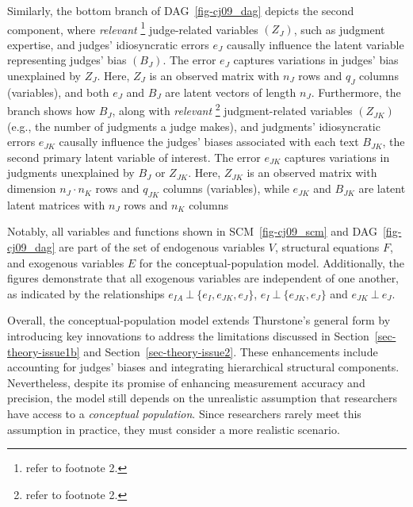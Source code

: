 \documentclass[
  authoryear,
  review,
  1p]{elsarticle}
\begin{document}
Similarly, the bottom branch of DAG~\ref{fig-cj09_dag} depicts the
second component, where \emph{relevant} \footnote{refer to footnote 2.}
judge-related variables \((Z_{J})\), such as judgment expertise, and
judges' idiosyncratic errors \(e_{J}\) causally influence the latent
variable representing judges' bias \((B_{J})\). The error \(e_{J}\)
captures variations in judges' bias unexplained by \(Z_{J}\). Here,
\(Z_{J}\) is an observed matrix with \(n_{J}\) rows and \(q_{J}\)
columns (variables), and both \(e_{J}\) and \(B_{J}\) are latent vectors
of length \(n_{J}\). Furthermore, the branch shows how \(B_{J}\), along
with \emph{relevant} \footnote{refer to footnote 2.} judgment-related
variables \((Z_{JK})\) (e.g., the number of judgments a judge makes),
and judgments' idiosyncratic errors \(e_{JK}\) causally influence the
judges' biases associated with each text \(B_{JK}\), the second primary
latent variable of interest. The error \(e_{JK}\) captures variations in
judgments unexplained by \(B_{J}\) or \(Z_{JK}\). Here, \(Z_{JK}\) is an
observed matrix with dimension \(n_{J} \cdot n_{K}\) rows and \(q_{JK}\)
columns (variables), while \(e_{JK}\) and \(B_{JK}\) are latent latent
matrices with \(n_{J}\) rows and \(n_{K}\) columns

Notably, all variables and functions shown in SCM~\ref{fig-cj09_scm} and
DAG~\ref{fig-cj09_dag} are part of the set of endogenous variables
\(V\), structural equations \(F\), and exogenous variables \(E\) for the
conceptual-population model. Additionally, the figures demonstrate that
all exogenous variables are independent of one another, as indicated by
the relationships \(e_{IA} \:\bot\:\{ e_{I}, e_{JK}, e_{J} \}\),
\(e_{I} \:\bot\:\{ e_{JK}, e_{J} \}\) and \(e_{JK} \:\bot\:e_{J}\).

Overall, the conceptual-population model extends Thurstone's general
form by introducing key innovations to address the limitations discussed
in Section~\ref{sec-theory-issue1b} and Section~\ref{sec-theory-issue2}.
These enhancements include accounting for judges' biases and integrating
hierarchical structural components. Nevertheless, despite its promise of
enhancing measurement accuracy and precision, the model still depends on
the unrealistic assumption that researchers have access to a
\emph{conceptual population}. Since researchers rarely meet this
assumption in practice, they must consider a more realistic scenario.
\end{document}
